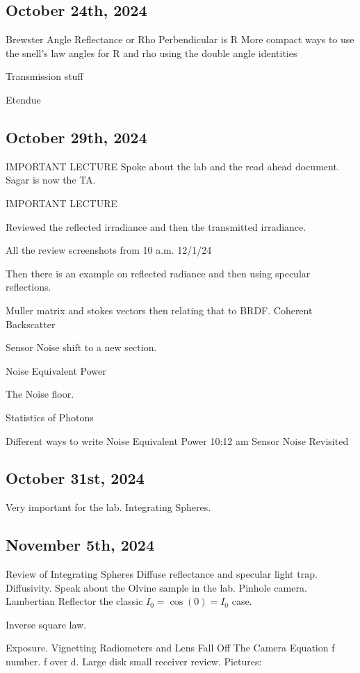 \documentclass{article}
\begin{document}
\subsection{October 24th, 2024}
Brewster Angle 
Reflectance or Rho Perbendicular is R 
More compact ways to use the snell's law angles for R and rho using the double angle identities

Transmission stuff 

Etendue 


\subsection{October 29th, 2024}
IMPORTANT LECTURE 
Spoke about the lab and the read ahead document. 
Sagar is now the TA. 

IMPORTANT LECTURE

Reviewed the reflected irradiance and then the transmitted irradiance.


All the review screenshots from 10 a.m. 12/1/24

Then there is an example on reflected radiance and then using specular reflections. 

Muller matrix and stokes vectors then relating that to BRDF. 
Coherent Backscatter

Sensor Noise shift to a new section. 

Noise Equivalent Power

The Noise floor. 

Statistics of Photons

Different ways to write Noise Equivalent Power
 10:12 am 
 Sensor Noise Revisited 

\subsection{October 31st, 2024}
Very important for the lab. 
Integrating Spheres. 


\subsection{November 5th, 2024}
Review of Integrating Spheres
Diffuse reflectance and specular light trap. 
Diffusivity. 
Speak about the Olvine sample in the lab. 
Pinhole camera. 
Lambertian Reflector the classic $I_0=\cos(0)=I_0$ case. 

Inverse square law. 

Exposure. 
Vignetting 
Radiometers and Lens Fall Off
The Camera Equation 
f number. f over d. 
Large disk small receiver review. 
Pictures: 
\end{document}
